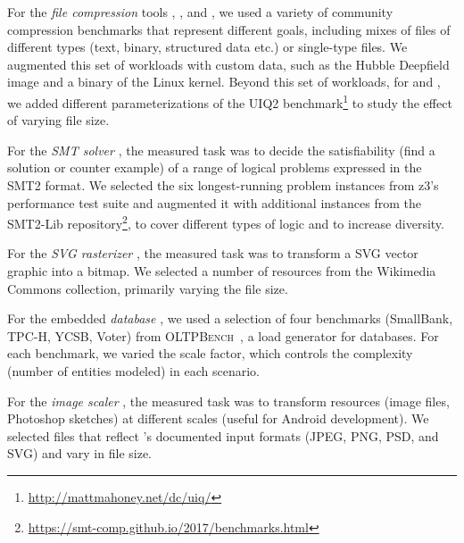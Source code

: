{{For the \textit{file compression} tools \kanzi, \xz, and \lrzip, we used a variety of community compression benchmarks that represent different goals, including mixes of files of different types (text, binary, structured data etc.) or single-type files. We augmented this set of workloads with custom data, such as the Hubble Deepfield image and a binary of the Linux kernel. Beyond this set of workloads, for \xz and \lrzip, we added different parameterizations of the UIQ2 benchmark\footnote{\url{http://mattmahoney.net/dc/uiq/}} to study the effect of varying file size. 

For the \textit{SMT solver} \zdrei, the measured task was to decide the satisfiability (find a solution or counter example) of a range of logical problems expressed in the SMT2 format. We selected the six longest-running problem instances from z3’s performance test suite and augmented it with additional instances from the SMT2-Lib repository\footnote{\url{https://smt-comp.github.io/2017/benchmarks.html}}, to cover different types of logic and to increase diversity.

For the \textit{SVG rasterizer} \batik, the measured task was to transform a SVG vector graphic into a bitmap. We selected a number of resources from the Wikimedia Commons collection, primarily varying the file size.

For the embedded \textit{database} \htwo, we used a selection of four benchmarks (SmallBank, TPC-H, YCSB, Voter) from \textsc{OLTPBench}~\cite{difallah_oltp_2013}, a load generator for databases. For each benchmark, we varied the scale factor, which controls the complexity (number of entities modeled) in each scenario.

For the \textit{image scaler} \dconvert, the measured task was to transform resources (image files, Photoshop sketches) at different scales (useful for Android development). We selected files that reflect \dconvert's documented input formats (JPEG, PNG, PSD, and SVG) and vary in file size.
}

}
